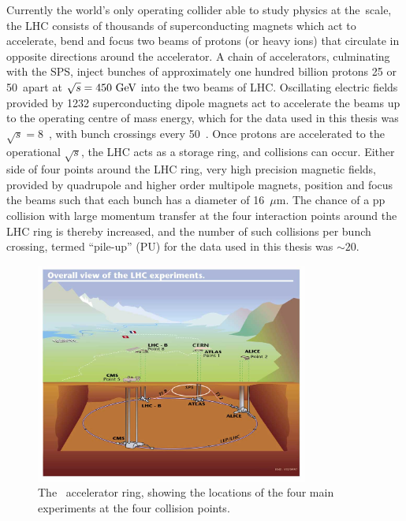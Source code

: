 Currently the world's only operating collider able to study physics at the~\TeV scale, the \ac{LHC} consists of thousands of superconducting magnets which act to accelerate, bend and focus two beams of protons (or heavy ions) that circulate in opposite directions around the accelerator. 
A chain of accelerators, culminating with the \ac{SPS}, inject bunches of approximately one hundred billion protons 25 or 50~\ns apart at $\sqrt{s} = 450~\mathrm{GeV}$ into the two beams of \ac{LHC}.
Oscillating electric fields provided by 1232 superconducting dipole magnets act to accelerate the beams up to the operating centre of mass energy, which for the data used in this thesis was $\sqrt{s} = 8$~\TeV, with bunch crossings every 50~\ns.
Once protons are accelerated to the operational $\sqrt{s}$, the \ac{LHC} acts as a storage ring, and collisions can occur.
%
Either side of four points around the \ac{LHC} ring, very high precision magnetic fields, provided by quadrupole and higher order multipole magnets, position and focus the beams such that each bunch has a diameter of 16~$\mu$m. 
The chance of a pp collision with large momentum transfer at the four interaction points around the LHC ring is thereby increased, and the number of such collisions per bunch crossing, termed ``pile-up'' (PU) for the data used in this thesis was $\sim20$.

\begin{figure}[htbp]
  \begin{center}
  \includegraphics[width=0.8\textwidth]{Figures/detector/LHCdesign}
  \caption{The ~\LHC accelerator ring, showing the locations of the four main experiments at the four collision points.
}
  \label{fig:LHC}
  \end{center}
\end{figure}

